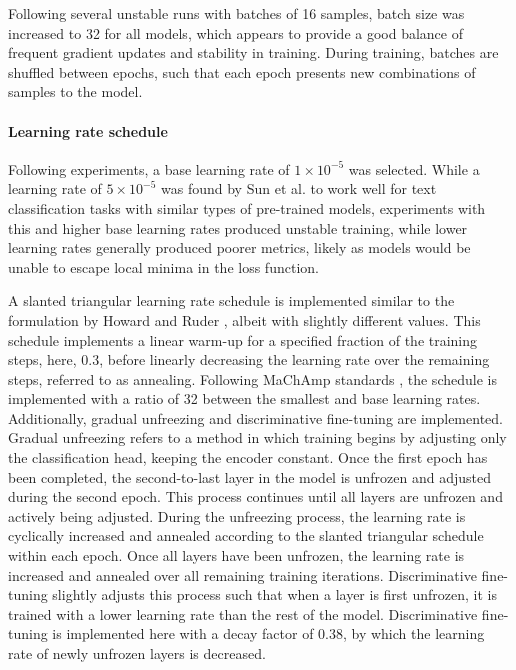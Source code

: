 \documentclass[12pt]{report}
\begin{document}
Following several unstable runs with batches of 16 samples, batch size was increased to 32 for all models, which appears to provide a good balance of frequent gradient updates and stability in training.
During training, batches are shuffled between epochs, such that each epoch presents new combinations of samples to the model.

\paragraph*{Learning rate schedule}
Following experiments, a base learning rate of $1 \times 10^{-5}$ was selected.
While a learning rate of $5 \times 10^{-5}$ was found by Sun et al. \citeyear{Sun2020} to work well for text classification tasks with similar types of pre-trained models, experiments with this and higher base learning rates produced unstable training, while lower learning rates generally produced poorer metrics, likely as models would be unable to escape local minima in the loss function.

A slanted triangular learning rate schedule is implemented similar to the formulation by Howard and Ruder \citeyear{Howard2018}, albeit with slightly different values.
This schedule implements a linear warm-up for a specified fraction of the training steps, here, 0.3, before linearly decreasing the learning rate over the remaining steps, referred to as annealing.
Following MaChAmp standards \cite{MaChAmp}, the schedule is implemented with a ratio of 32 between the smallest and base learning rates.
Additionally, gradual unfreezing and discriminative fine-tuning are implemented.
Gradual unfreezing refers to a method in which training begins by adjusting only the classification head, keeping the encoder constant.
Once the first epoch has been completed, the second-to-last layer in the model is unfrozen and adjusted during the second epoch.
This process continues until all layers are unfrozen and actively being adjusted.
During the unfreezing process, the learning rate is cyclically increased and annealed according to the slanted triangular schedule within each epoch.
Once all layers have been unfrozen, the learning rate is increased and annealed over all remaining training iterations.
Discriminative fine-tuning slightly adjusts this process such that when a layer is first unfrozen, it is trained with a lower learning rate than the rest of the model.
Discriminative fine-tuning is implemented here with a decay factor of 0.38, by which the learning rate of newly unfrozen layers is decreased.
\end{document}
